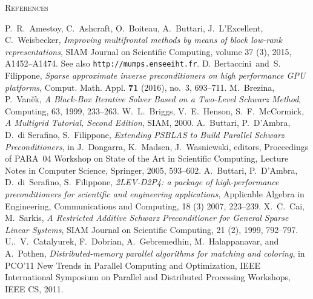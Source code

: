 \begin{thebibliography}{99}
\ifpdf
{}
\fi
{}
         {\textsc{References}}

%
P.~R.~Amestoy, C.~Ashcraft, O.~Boiteau, A.~Buttari, J.~L'Excellent, C.~Weisbecker,
{\em Improving multifrontal methods by means of block low-rank representations},
SIAM Journal on Scientific Computing, volume 37 (3), 2015, A1452--A1474.
See also {\tt http://mumps.enseeiht.fr}.
%
D. Bertaccini\ and\ S. Filippone, 
{\em Sparse approximate inverse preconditioners on high performance GPU platforms}, 
Comput. Math. Appl. {\bf 71} (2016), no.~3, 693--711.
%
M.~Brezina, P.~Van\v{e}k,
{\em A Black-Box Iterative Solver Based on a Two-Level Schwarz Method},
Computing, 63, 1999, 233--263.
%
W.~L.~Briggs, V.~E.~Henson, S.~F.~McCormick,
{\em A Multigrid Tutorial, Second Edition},
SIAM, 2000.
%
A.~Buttari, P.~D'Ambra, D.~di Serafino, S.~Filippone,
{\em Extending PSBLAS to Build Parallel Schwarz Preconditioners},
in J.~Dongarra, K.~Madsen, J.~Wasniewski, editors,
Proceedings of PARA~04 Workshop on State of the Art
in Scientific Computing, Lecture Notes in Computer Science,
Springer, 2005, 593--602.
%
A.~Buttari, P.~D'Ambra, D.~di~Serafino, S.~Filippone,
{\em 2LEV-D2P4: a package of high-performance preconditioners
for scientific and engineering applications},
Applicable Algebra in Engineering, Communications and Computing,
18 (3) 2007, 223--239.
%
X.~C.~Cai, M.~Sarkis,
{\em A Restricted Additive Schwarz Preconditioner for General Sparse Linear Systems},
SIAM Journal on Scientific Computing, 21 (2), 1999, 792--797.
%
U..~V.~Catalyurek, F.~Dobrian, A.~Gebremedhin, M.~Halappanavar, and A.~Pothen,
{\em Distributed-memory parallel algorithms for matching and coloring}, in PCO’11 New Trends
in Parallel Computing and Optimization, IEEE International Symposium on Parallel and
Distributed Processing Workshops, IEEE CS, 2011.
%

\end{thebibliography}
